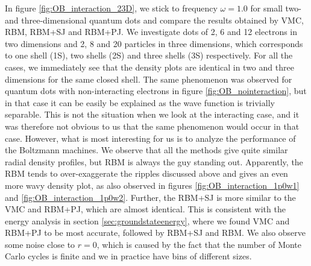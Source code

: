 In figure \eqref{fig:OB_interaction_23D}, we stick to frequency $\omega=1.0$ for small two- and three-dimensional quantum dots and compare the results obtained by VMC, RBM, RBM+SJ and RBM+PJ. We investigate dots of 2, 6 and 12 electrons in two dimensions and 2, 8 and 20 particles in three dimensions, which corresponds to one shell (1S), two shells (2S) and three shells (3S) respectively. For all the cases, we immediately see that the density plots are identical in two and three dimensions for the same closed shell. The same phenomenon was observed for quantum dots with non-interacting electrons in figure \eqref{fig:OB_nointeraction}, but in that case it can be easily be explained as the wave function is trivially separable. This is not the situation when we look at the interacting case, and it was therefore not obvious to us that the same phenomenon would occur in that case. However, what is most interesting for us is to analyze the performance of the Boltzmann machines. We observe that all the methods give quite similar radial density profiles, but RBM is always the guy standing out. Apparently, the RBM tends to over-exaggerate the ripples discussed above and gives an even more wavy density plot, as also observed in figures \eqref{fig:OB_interaction_1p0w1} and \eqref{fig:OB_interaction_1p0w2}. Further, the RBM+SJ is more similar to the VMC and RBM+PJ, which are almost identical. This is consistent with the energy analysis in section \ref{sec:groundstateenergy}, where we found VMC and RBM+PJ to be most accurate, followed by RBM+SJ and RBM. We also observe some noise close to $r=0$, which is caused by the fact that the number of Monte Carlo cycles is finite and we in practice have bins of different sizes.

